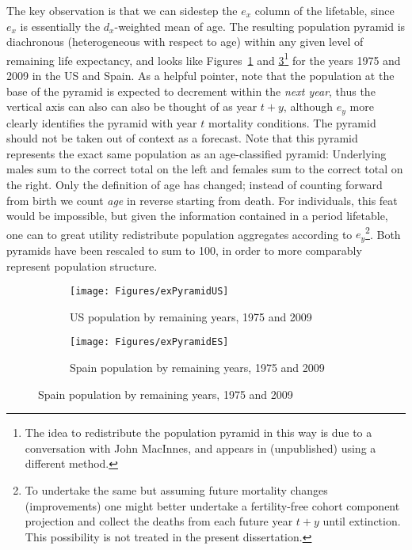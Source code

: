  \FloatBarrier

The key
observation is that we can sidestep the $e_x$ column of the lifetable, since
$e_x$ is essentially the $d_x$-weighted mean of age. The resulting
population pyramid is diachronous (heterogeneous with respect to age) within any
given level of remaining life expectancy, and looks like
Figures~\ref{fig:exPyrUS} and \ref{fig:exPyrES}\footnote{The idea to
redistribute the population pyramid in this way is due to a conversation with 
John MacInnes, and appears in \citep{MacInnes2013pop} (unpublished) using a
different method.} for the years 1975 and 2009 in the US and Spain. As a helpful
pointer, note that the population at the base of the pyramid is expected to decrement
within the \textit{next year}, thus the vertical axis can also can also be
thought of as year $t+y$, although $e_y$ more clearly identifies the pyramid
with year $t$ mortality conditions. The pyramid should not be
taken out of context as a forecast. Note that this pyramid represents the exact same
population as an age-classified pyramid: Underlying males sum to the correct total on 
the left and females sum to the correct total on the right. Only the definition of age has
changed; instead of counting forward from birth we count \textit{age} in reverse
starting from death. For individuals, this feat would be impossible, but given
 the information contained in a period lifetable, one can to great utility 
 redistribute population aggregates according to $e_y$\footnote{To undertake
 the same but assuming future mortality changes (improvements) one might
 better undertake a fertility-free cohort component projection and collect the
 deaths from each future year $t+y$ until extinction. This possibility is not
 treated in the present dissertation.}. Both pyramids have been rescaled
 to sum to 100, in order to more comparably represent population structure.

\begin{figure}
        \centering
        \begin{subfigure}
                \centering
                \caption{US population by remaining years, 1975 and 2009}
                \texttt{[image: Figures/exPyramidUS]}
                \label{fig:exPyrUS}
        \end{subfigure}
        \begin{subfigure}
                \centering
                \caption{Spain population by remaining years, 1975 and 2009}
                \texttt{[image: Figures/exPyramidES]}
               
                \label{fig:exPyrES}
        \end{subfigure}
\end{figure}

